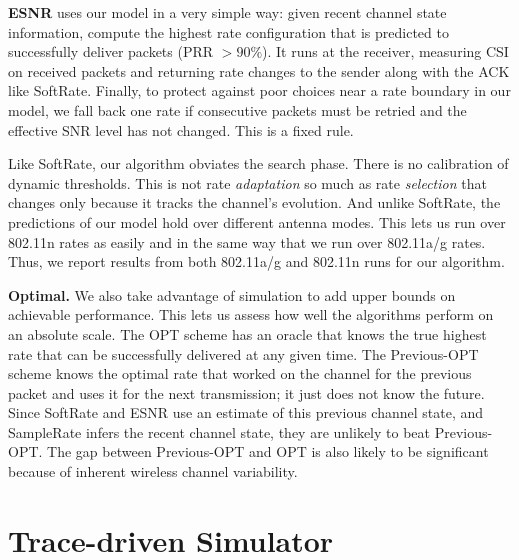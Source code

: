 \textbf{ESNR} uses our model in a very simple way: given recent channel state information, compute the highest rate configuration that is predicted to successfully deliver packets (PRR $>90\%$). It runs at the receiver, measuring CSI on received packets and returning rate changes to the sender along with the ACK like SoftRate. Finally, to protect against poor choices near a rate boundary in our model, we fall back one rate if consecutive packets must be retried and the effective SNR level has not changed. This is a fixed rule.

Like SoftRate, our algorithm obviates the search phase. There is no calibration of dynamic thresholds. This is not rate \emph{adaptation} so much as rate \emph{selection} that changes only because it tracks the channel's evolution. And unlike SoftRate, the predictions of our model hold over different antenna modes. This lets us run over 802.11n rates as easily and in the same way that we run over 802.11a/g rates. Thus, we report results from both 802.11a/g and 802.11n runs for our algorithm.

\textbf{Optimal.} We also take advantage of simulation to add upper bounds on achievable performance. This lets us assess how well the algorithms perform on an absolute scale. The OPT scheme has an oracle that knows the true highest rate that can be successfully delivered at any given time. The Previous-OPT scheme knows the optimal rate that worked on the channel for the previous packet and uses it for the next transmission; it just does not know the future. Since SoftRate and ESNR use an estimate of this previous channel state, and SampleRate infers the recent channel state, they are unlikely to beat Previous-OPT\@. The gap between Previous-OPT and OPT is also likely to be significant because of inherent wireless channel variability.


\section{Trace-driven Simulator}


